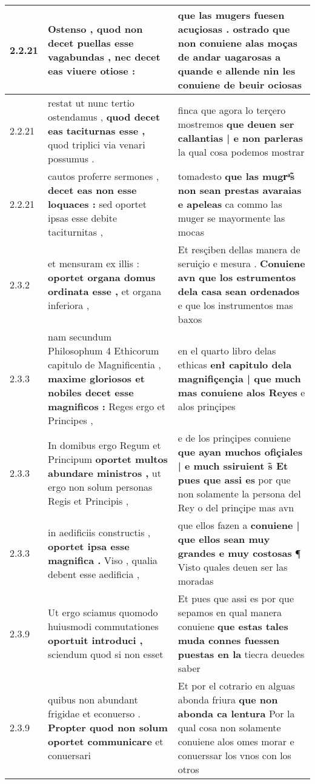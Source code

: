 \begin{tabular}{|p{1cm}|p{6.5cm}|p{6.5cm}|}
2.2.21 & Ostenso , \textbf{ quod non decet puellas esse vagabundas , } nec decet eas viuere otiose : & que las mugers fuesen acuçiosas . \textbf{ ostrado que non conuiene alas moças de andar uagarosas a quande e allende } nin les conuiene de beuir ociosas \\\hline
2.2.21 & restat ut nunc tertio ostendamus , \textbf{ quod decet eas taciturnas esse , } quod triplici via venari possumus . & finca que agora lo terçero mostremos \textbf{ que deuen ser callantias | e non parleras } la qual cosa podemos mostrar \\\hline
2.2.21 & cautos proferre sermones , \textbf{ decet eas non esse loquaces : } sed oportet ipsas esse debite taciturnitas , & tomadesto \textbf{ que las mugrͣ̃s non sean prestas avaraias e apeleas } ca commo las muger se mayormente las mocas \\\hline
2.3.2 & et mensuram ex illis : \textbf{ oportet organa domus ordinata esse , } et organa inferiora , & Et resçiben dellas manera de seruiçio e mesura . \textbf{ Conuiene avn que los estrumentos dela casa sean ordenados } e que los instrumentos mas baxos \\\hline
2.3.3 & nam secundum Philosophum 4 Ethicorum capitulo de Magnificentia , \textbf{ maxime gloriosos et nobiles decet esse magnificos : } Reges ergo et Principes , & en el quarto libro delas ethicas \textbf{ enł capitulo dela magnifiçençia | que much mas conuiene alos Reyes } e alos prinçipes \\\hline
2.3.3 & In domibus ergo Regum et Principum \textbf{ oportet multos abundare ministros , } ut ergo non solum personas Regis et Principis , & e de los prinçipes conuiene \textbf{ que ayan muchos ofiçiales | e much ssiruient s̃ Et pues que assi es } por que non solamente la persona del Rey o del prinçipe mas avn \\\hline
2.3.3 & in aedificiis constructis , \textbf{ oportet ipsa esse magnifica . } Viso , qualia debent esse aedificia , & que ellos fazen a \textbf{ conuiene | que ellos sean muy grandes e muy costosas } ¶ Visto quales deuen ser las moradas \\\hline
2.3.9 & Ut ergo sciamus quomodo huiusmodi commutationes \textbf{ oportuit introduci , } sciendum quod si non esset & Et pues que assi es por que sepamos en qual manera conuiene \textbf{ que estas tales muda connes fuessen puestas en la } tiecra deuedes saber \\\hline
2.3.9 & quibus non abundant frigidae et econuerso . \textbf{ Propter quod non solum oportet communicare } et conuersari & Et por el cotrario en alguas abonda friura \textbf{ que non abonda ca lentura } Por la qual cosa non solamente conuiene alos omes morar e conuerssar los vnos con los otros \\\hline

\end{tabular}
